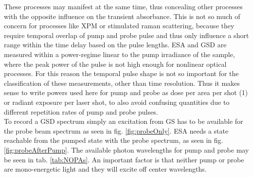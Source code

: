 \documentclass[twoside,openright]{scrreprt}
\begin{document}
These processes may manifest at the same time, thus concealing other processes with the opposite influence on the transient absorbance. This is not so much of concern for processes like XPM or stimulated raman scattering, because they require temporal overlap of pump and probe pulse and thus only influence a short range within the time delay based on the pulse lengths. ESA and GSD are measured within a power-regime linear to the pump irradiance of the sample, where the peak power of the pulse is not high enough for nonlinear optical processes. For this reason the temporal pulse shape is not so important for the classification of these measurements, other than time resolution. Thus it makes sense to write powers used here for pump and probe as dose per area per shot (\SI{1}{\radExp}) or radiant exposure per laser shot, to also avoid confusing quantities due to different repetition rates of pump and probe pulses.\\

To record a GSD spectrum simply an excitation from GS has to be available for the probe beam spectrum as seen in fig. \ref{fig:probeOnly}. ESA needs a state reachable from the pumped state with the probe spectrum, as seen in fig. \ref{fig:probeAfterPump}. The available photon wavelengths for pump and probe may be seen in tab. \ref{tab:NOPAs}. An important factor is that neither pump or probe are mono-energetic light and they will excite off center wavelengths.
\end{document}
